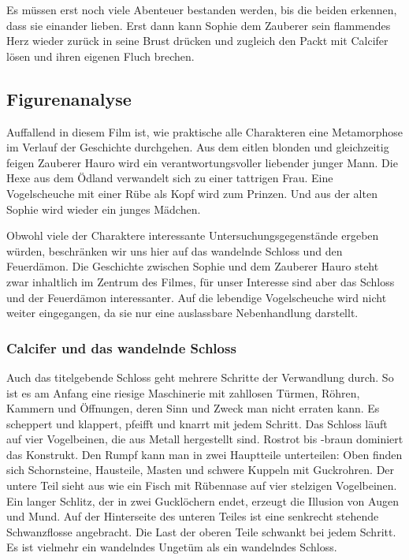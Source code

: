 Es müssen erst noch viele Abenteuer bestanden werden, bis die beiden erkennen, dass sie einander lieben. Erst dann kann Sophie dem Zauberer sein flammendes Herz wieder zurück in seine Brust drücken und zugleich den Packt mit Calcifer lösen und ihren eigenen Fluch brechen. 

\subsection{Figurenanalyse} 
Auffallend in diesem Film ist, wie praktische alle Charakteren eine Metamorphose im Verlauf der Geschichte durchgehen. Aus dem eitlen blonden und gleichzeitig feigen Zauberer Hauro wird ein verantwortungsvoller liebender junger Mann. Die Hexe aus dem Ödland verwandelt sich zu einer tattrigen Frau. Eine Vogelscheuche mit einer Rübe als Kopf wird zum Prinzen. Und aus der alten Sophie wird wieder ein junges Mädchen.  

Obwohl viele der Charaktere interessante Untersuchungsgegenstände ergeben würden, beschränken wir uns hier auf das wandelnde Schloss und den Feuerdämon. Die Geschichte zwischen Sophie und dem Zauberer Hauro steht zwar inhaltlich im Zentrum des Filmes, für unser Interesse sind aber das Schloss und der Feuerdämon interessanter. Auf die lebendige Vogelscheuche wird nicht weiter eingegangen, da sie nur eine auslassbare Nebenhandlung darstellt. 

\subsubsection*{Calcifer und das wandelnde Schloss} 
Auch das titelgebende Schloss geht mehrere Schritte der Verwandlung durch. So ist es am Anfang eine riesige Maschinerie mit zahllosen Türmen, Röhren, Kammern und Öffnungen, deren Sinn und Zweck man nicht erraten kann. Es scheppert und klappert, pfeifft und knarrt mit jedem Schritt. Das Schloss läuft auf vier Vogelbeinen, die aus Metall hergestellt sind. Rostrot bis -braun dominiert das Konstrukt. Den Rumpf kann man in zwei Hauptteile unterteilen: Oben finden sich Schornsteine, Hausteile, Masten und schwere Kuppeln mit Guckrohren. Der untere Teil sieht aus wie ein Fisch mit Rübennase auf vier stelzigen Vogelbeinen. Ein langer Schlitz, der in zwei Gucklöchern endet, erzeugt die Illusion von Augen und Mund. Auf der Hinterseite des unteren Teiles ist eine senkrecht stehende Schwanzflosse angebracht. Die Last der oberen Teile schwankt bei jedem Schritt. Es ist vielmehr ein wandelndes Ungetüm als ein wandelndes Schloss. 

